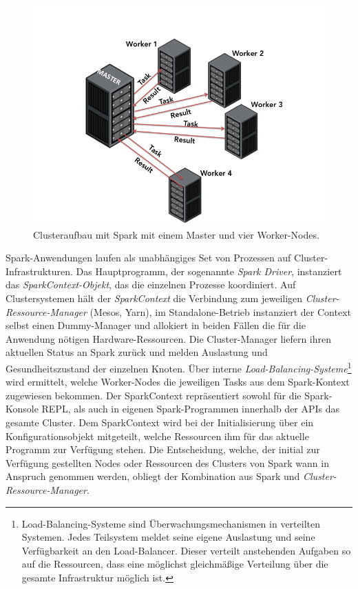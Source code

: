 \begin{figure}[htb!]
\centering
\includegraphics[width=1.0\textwidth]{bilder/spark1.png}
\caption{Clusteraufbau mit Spark mit einem Master und vier Worker-Nodes. }
\label{fig:sparkclustermastermitworker}
\end{figure} 



Spark-Anwendungen laufen als unabhängiges Set von Prozessen auf Cluster-Infrastrukturen. Das Hauptprogramm, der sogenannte \textit{Spark Driver}, instanziert das\textit{ SparkContext-Objekt}, das die einzelnen Prozesse koordiniert. Auf Clustersystemen hält der \textit{SparkContext} die Verbindung zum jeweiligen \textit{Cluster-Ressource-Manager} (Mesos, Yarn), im Standalone-Betrieb instanziert der Context selbst einen Dummy-Manager und allokiert in beiden Fällen die für die Anwendung nötigen Hardware-Ressourcen. Die Cluster-Manager liefern ihren aktuellen Status an Spark zurück und melden Auslastung und Gesundheitszustand der einzelnen Knoten. Über interne \textit{Load-Balancing-Systeme}\footnote{Load-Balancing-Systeme sind Überwachungsmechanismen in verteilten Systemen. Jedes Teilsystem meldet seine eigene Auslastung und seine Verfügbarkeit an den Load-Balancer. Dieser verteilt anstehenden Aufgaben so auf die Ressourcen, dass eine möglichst gleichmäßige Verteilung über die gesamte Infrastruktur möglich ist.} wird ermittelt, welche Worker-Nodes die jeweiligen Tasks aus dem Spark-Kontext zugewiesen bekommen. Der SparkContext repräsentiert sowohl für die Spark-Konsole REPL, als auch in eigenen Spark-Programmen innerhalb der APIs das gesamte Cluster. Dem SparkContext wird bei der Initialisierung über ein Konfigurationsobjekt mitgeteilt, welche Ressourcen ihm für das aktuelle Programm zur Verfügung stehen. Die Entscheidung, welche, der initial zur Verfügung gestellten Nodes oder Ressourcen des Clusters von Spark wann in Anspruch genommen werden, obliegt der Kombination aus Spark und \textit{Cluster-Ressource-Manager}. 

